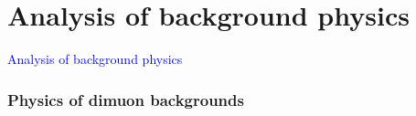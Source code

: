 \documentclass[compress]{beamer}
\begin{document}
\section*{Analysis of background physics}
\begin{frame}
\begin{center}
\Huge \textcolor{blue}{Analysis of background physics}
\end{center}
\end{frame}

\begin{frame}
\frametitle{Physics of dimuon backgrounds}

\begin{columns}


\end{columns}
\end{frame}
\end{document}
